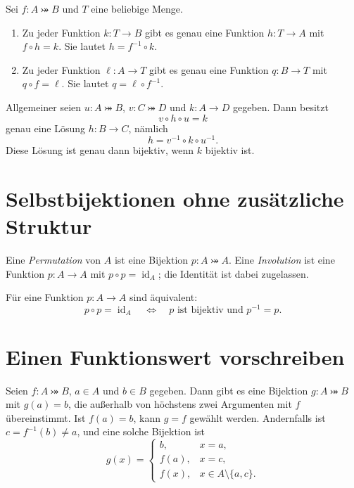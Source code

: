\begin{theorem}
\label{b08guide:thm:equations}
Sei $f\colon A\bij B$ und $T$ eine beliebige Menge.
\begin{enumerate}
\item Zu jeder Funktion $k\colon T\to B$ gibt es genau eine Funktion
      $h\colon T\to A$ mit $f\circ h=k$. Sie lautet $h=f^{-1}\circ k$.
\item Zu jeder Funktion $\ell\colon A\to T$ gibt es genau eine Funktion
      $q\colon B\to T$ mit $q\circ f=\ell$. Sie lautet $q=\ell\circ f^{-1}$.
\end{enumerate}
Allgemeiner seien $u\colon A\bij B$, $v\colon C\bij D$ und
$k\colon A\to D$ gegeben. Dann besitzt
\[
 v\circ h\circ u=k
\]
genau eine Lösung $h\colon B\to C$, nämlich
\[
 h=v^{-1}\circ k\circ u^{-1}.
\]
Diese Lösung ist genau dann bijektiv, wenn $k$ bijektiv ist.
\end{theorem}

\section{Selbstbijektionen ohne zusätzliche Struktur}

\begin{definition}
Eine \emph{Permutation} von $A$ ist eine Bijektion $p\colon A\bij A$.
Eine \emph{Involution} ist eine Funktion $p\colon A\to A$ mit
$p\circ p=\operatorname{id}_A$; die Identität ist dabei zugelassen.
\end{definition}

\begin{theorem}[Selbstumkehrung]
\label{b08guide:thm:selfinverse}
Für eine Funktion $p\colon A\to A$ sind äquivalent:
\[
 p\circ p=\operatorname{id}_A
 \quad\Longleftrightarrow\quad
 p\text{ ist bijektiv und }p^{-1}=p.
\]
\end{theorem}

\section{Einen Funktionswert vorschreiben}

\begin{theorem}
\label{b08guide:thm:pointed}
Seien $f\colon A\bij B$, $a\in A$ und $b\in B$ gegeben.
Dann gibt es eine Bijektion $g\colon A\bij B$ mit $g(a)=b$, die
außerhalb von höchstens zwei Argumenten mit $f$ übereinstimmt.
Ist $f(a)=b$, kann $g=f$ gewählt werden. Andernfalls ist
$c=f^{-1}(b)\ne a$, und eine solche Bijektion ist
\[
 g(x)=\begin{cases}
 b,&x=a,\\
 f(a),&x=c,\\
 f(x),&x\in A\setminus\{a,c\}.
 \end{cases}
\]
\end{theorem}
